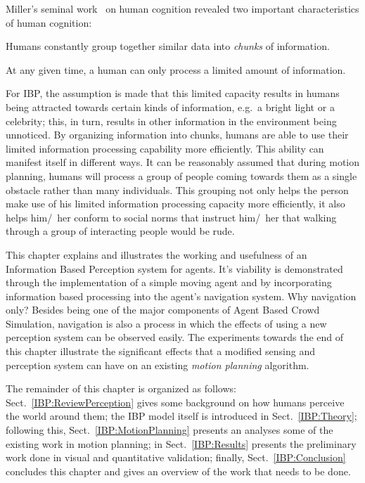 Miller's seminal work~\cite{Miller:1956tr} on human cognition revealed two important characteristics of human cognition:
\begin{inparaenum}
\item Humans constantly group together similar data into \emph{chunks} of information.
\item At any given time, a human can only process a limited amount of information.
\end{inparaenum}
For IBP, the assumption is made that this limited capacity results in humans being attracted towards certain kinds of information, e.g.\ a bright light or a celebrity; this, in turn, results in other information in the environment being unnoticed. By organizing information into chunks, humans are able to use their limited information processing capability more efficiently. This ability can manifest itself in different ways. It can be reasonably assumed that during motion planning, humans will process a group of people coming towards them as a single obstacle rather than many individuals. This grouping not only helps the person make use of his limited information processing capacity more efficiently,  it also helps him/~her conform to social norms that instruct him/~her that walking through a group of interacting people would be rude.


This chapter explains and illustrates the working and usefulness of an Information Based Perception system for agents. It's viability is demonstrated through the implementation of a simple moving agent and by incorporating information based processing into the agent's navigation system. Why navigation only? Besides being one of the major components of Agent Based Crowd Simulation, navigation is also a process in which the effects of using a new perception system can be observed easily. The experiments towards the end of this chapter illustrate the significant effects that a modified sensing and perception system can have on an existing \emph{motion planning} algorithm.

The remainder of this chapter is organized as follows: Sect.~\ref{IBP:ReviewPerception} gives some background on how humans perceive the world around them; the IBP model itself is introduced in Sect.~\ref{IBP:Theory}; following this, Sect.~\ref{IBP:MotionPlanning} presents an analyses some of the existing work in motion planning; in Sect.~\ref{IBP:Results} presents the preliminary work done in visual and quantitative validation; finally, Sect.~\ref{IBP:Conclusion} concludes this chapter and gives an overview of the work that needs to be done.

